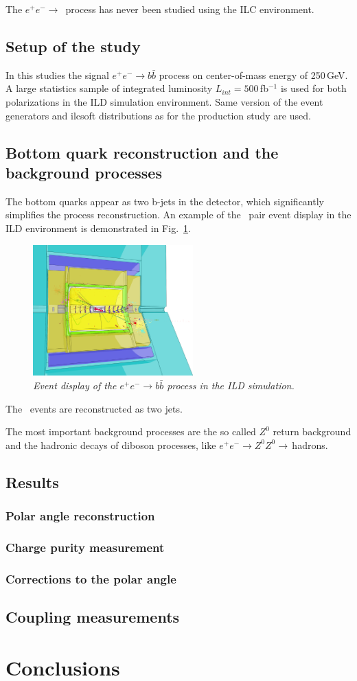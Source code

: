 The $e^+e^-\to$\bbbar\ process has never been studied using the ILC environment. 
\subsection{Setup of the study}
In this studies the signal $e^+e^-\to b\bar{b}$ process on center-of-mass energy of 250\,GeV. 
A large statistics sample of integrated luminosity $L_{int}= 500$\,fb{$^{-1}$} is used for both polarizations in the ILD simulation environment. 
Same version of the event generators and {\sc ilcsoft} distributions as for the \ttbar production study are used.


\subsection{Bottom quark reconstruction and the background processes}
The bottom quarks appear as two b-jets in the detector, which significantly simplifies the process reconstruction. 
An example of the \bbbar\ pair event display in the ILD environment is demonstrated in Fig.~\ref{fig:BottomEvent_3}. 
\begin{figure}[h]
	{\centering
		\includegraphics[width=0.55\textwidth]{ILD/graphics/ild-bbbar.png}
		\caption{\sl Event display of the $e^+e^-\to b\bar{b}$ process in the ILD simulation.
		}
		\label{fig:BottomEvent_3}
	}
	
\end{figure}

The \bbbar\ events are reconstructed as two jets. 

The most important background processes are the so called $Z^0$ return background and the hadronic decays of diboson processes, like $e^+e^-\to Z^0Z^0\to$\,hadrons.



\subsection{Results}
\label{sec:BBBarresults}
\subsubsection{Polar angle reconstruction}
\subsubsection{Charge purity measurement}
\label{sec:ChargePurity}
\subsubsection{Corrections to the polar angle}
\subsection{Coupling measurements}
\section*{Conclusions}